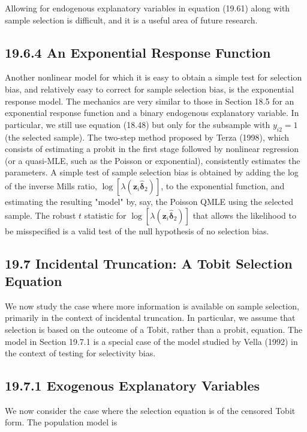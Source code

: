 \documentclass[10pt]{article}
\begin{document}
Allowing for endogenous explanatory variables in equation (19.61) along with sample selection is difficult, and it is a useful area of future research.

\subsection*{19.6.4 An Exponential Response Function}
Another nonlinear model for which it is easy to obtain a simple test for selection bias, and relatively easy to correct for sample selection bias, is the exponential response model. The mechanics are very similar to those in Section 18.5 for an exponential response function and a binary endogenous explanatory variable. In particular, we still use equation (18.48) but only for the subsample with $y_{i 2}=1$ (the selected sample). The two-step method proposed by Terza (1998), which consists of estimating a probit in the first stage followed by nonlinear regression (or a quasi-MLE, such as the Poisson or exponential), consistently estimates the parameters. A simple test of sample selection bias is obtained by adding the log of the inverse Mills ratio, $\log \left[\lambda\left(\mathbf{z}_{i} \hat{\boldsymbol{\delta}}_{2}\right)\right]$, to the exponential function, and estimating the resulting "model" by, say, the Poisson QMLE using the selected sample. The robust $t$ statistic for $\log \left[\lambda\left(\mathbf{z}_{i} \hat{\boldsymbol{\delta}}_{2}\right)\right]$ that allows the likelihood to be misspecified is a valid test of the null hypothesis of no selection bias.

\subsection*{19.7 Incidental Truncation: A Tobit Selection Equation}
We now study the case where more information is available on sample selection, primarily in the context of incidental truncation. In particular, we assume that selection is based on the outcome of a Tobit, rather than a probit, equation. The model in Section 19.7.1 is a special case of the model studied by Vella (1992) in the context of testing for selectivity bias.

\subsection*{19.7.1 Exogenous Explanatory Variables}
We now consider the case where the selection equation is of the censored Tobit form. The population model is
\end{document}
